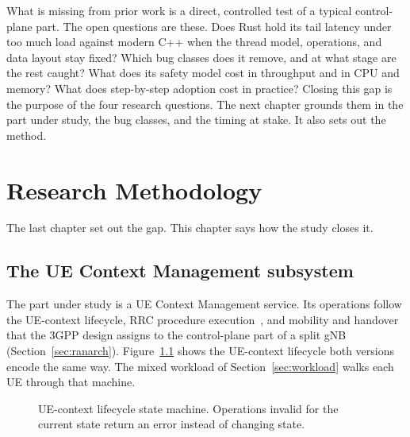 \documentclass[english,oneside,a4paper,censored,csm,software-track-2020]{HYthesisML}
\begin{document}
What is missing from prior work is a direct, controlled test of a typical
control-plane part. The open questions are these. Does Rust hold its tail
latency under too much load against modern C++ when the thread model, operations, and
data layout stay fixed? Which bug classes does it remove, and at what stage
are the rest caught? What does its safety model cost in throughput and in CPU
and memory? What does step-by-step adoption cost in practice? Closing this gap
is the purpose of the four research questions. The next chapter grounds them
in the part under study, the bug classes, and the timing at stake. It also
sets out the method.


\chapter{Research Methodology\label{chapter:methodology}}

The last chapter set out the gap. This chapter says how the study closes it.

\section{The UE Context Management subsystem}\label{sec:uecm}
The part under study is a UE Context Management service. Its operations follow the
UE-context lifecycle, RRC procedure execution~\cite{3gpp38331}, and mobility and
handover that the 3GPP design assigns to the control-plane part of a split gNB
(Section~\ref{sec:ranarch}). Figure~\ref{fig:fsm} shows the UE-context
lifecycle both versions encode the same way. The mixed workload of
Section~\ref{sec:workload} walks each UE through that machine.

\begin{figure}[ht]
\centering
{}
\caption[UE-context lifecycle state machine]{UE-context lifecycle state machine.
Operations invalid for the current state return an error instead of changing
state.\label{fig:fsm}}
\end{figure}
\end{document}
